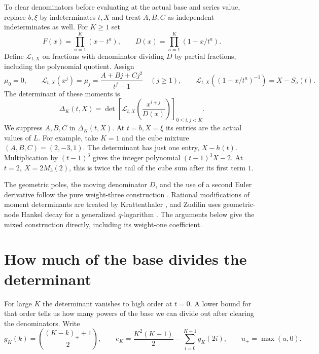 \documentclass[11pt]{article}
\newcommand{\cl}{\mathcal L}
\begin{document}
To clear denominators before evaluating at the actual base and series
value, replace \(b,\xi\) by indeterminates \(t,X\) and treat \(A,B,C\)
as independent indeterminates as well.
For \(K\ge1\) set
\[
 F(x)=\prod_{a=1}^K(x-t^a),\qquad
 D(x)=\prod_{a=1}^K(1-x/t^a).
\]
Define \(\cl_{t,X}\) on fractions with denominator dividing \(D\)
by partial fractions, including the polynomial quotient. Assign
\[
 \mu_0=0,\qquad
 \cl_{t,X}(x^j)=\mu_j=\frac{A+Bj+Cj^2}{t^j-1}\quad(j\ge1),\qquad
 \cl_{t,X}((1-x/t^a)^{-1})=X-S_a(t).
\]
The determinant of these moments is
\begin{equation}\label{eq:delta}
 \Delta_K(t,X)=
 \det\left[\cl_{t,X}\left(\frac{x^{i+j}}{D(x)}\right)\right]_{0\le i,j<K}.
\end{equation}
We suppress \(A,B,C\) in \(\Delta_K(t,X)\). At \(t=b,X=\xi\)
its entries are the actual values of \(L\). For example, take \(K=1\)
and the cube mixture \((A,B,C)=(2,-3,1)\). The determinant has just
one entry, \(X-h(t)\). Multiplication by \((t-1)^3\) gives the
integer polynomial \((t-1)^3 X-2\). At \(t=2,\ X=2M_3(2)\), this
is twice the tail of the cube sum after its first term \(1\).

The geometric poles, the moving denominator \(D\), and the use of
a second Euler derivative follow the pure weight-three construction
\cite[\S\S1--2]{Uplift}. Rational modifications of moment determinants
are treated by Krattenthaler \cite[\S1]{Kratt}, and Zudilin uses
geometric-node Hankel decay for a generalized \(q\)-logarithm
\cite[\S4]{ZudHankel}. The arguments below give the mixed construction
directly, including its weight-one coefficient.

\section{How much of the base divides the determinant}

For large \(K\) the determinant vanishes to high order at \(t=0\).
A lower bound for that order tells us how many powers of the base we
can divide out after clearing the denominators. Write
\[
 g_K(k)=\binom{(K-k)_++1}{2},\qquad
 e_K=\frac{K^2(K+1)}2-\sum_{i=0}^{K-1}g_K(2i),
 \qquad u_+=\max(u,0).
\]
\end{document}
